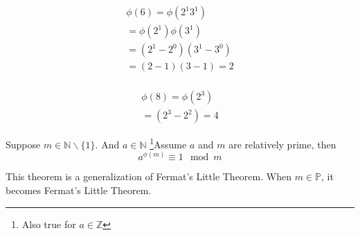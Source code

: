 \documentclass[11pt]{article}
\begin{document}
	\begin{example}
		\begin{gather*}
			\phi(6) = \phi(2^1 3^1) \\
			= \phi(2^1) \phi(3^1) \\
			= (2^1 - 2^0) (3^1 - 3^0) \\
			= (2 - 1)(3 - 1)
			= 2 \\
		\end{gather*}
	\end{example}
	\begin{example}
		\begin{gather*}
			\phi(8) = \phi(2^3)\\
			= (2^3 - 2^2) = 4
		\end{gather*}
	\end{example}
	
	\begin{theorem}
		Suppose $m \in \mathbb{N} \backslash \{1\}$. And $a \in \mathbb{N}$ \footnote{Also true for $a \in \mathbb{Z}$}Assume $a$ and $m$ are relatively prime, then 
		\[
			a^{\phi(m)} \equiv 1 \mod m
		\]
	\end{theorem}
	
	\begin{remark}
		This theorem is a generalization of Fermat's Little Theorem. When $m \in \mathbb{P}$, it becomes Fermat's Little Theorem.
	\end{remark}
	
\end{document}
